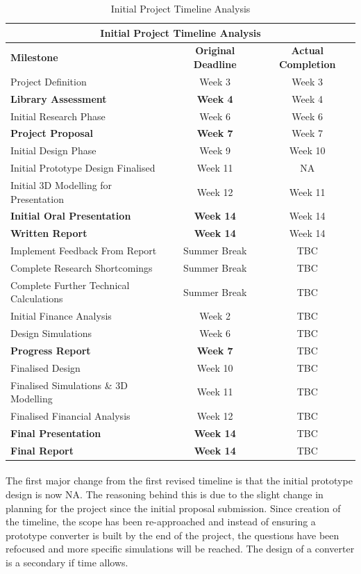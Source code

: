 \begin{table}[H]
\centering
\begin{tabular}{||p{5cm} c c||} 
 \hline
 \multicolumn{3}{|c|}{\textbf{Initial Project Timeline Analysis}} \\ \hline\hline
 \textbf{Milestone} & \textbf{Original Deadline} & \textbf{Actual Completion} \\ [0.5ex] 
 \hline\hline
 Project Definition & Week 3 & Week 3\\ 
 \textbf{Library Assessment} & \textbf{Week 4} & Week 4\\
 Initial Research Phase & Week 6 & Week 6\\
 \textbf{Project Proposal} & \textbf{Week 7} & Week 7\\
 Initial Design Phase & Week 9 & Week 10\\
 Initial Prototype Design Finalised & Week 11 & NA\\
 Initial 3D Modelling for Presentation & Week 12 & Week 11\\ 
 \textbf{Initial Oral Presentation} & \textbf{Week 14} & Week 14\\
 \textbf{Written Report} & \textbf{Week 14} & Week 14\\ 
 Implement Feedback From Report & Summer Break & TBC \\
 Complete Research Shortcomings & Summer Break & TBC \\
 Complete Further Technical Calculations & Summer Break & TBC \\
 Initial Finance Analysis & Week 2 & TBC \\
 Design Simulations & Week 6 & TBC \\ 
 \textbf{Progress Report} & \textbf{Week 7} & TBC \\
 Finalised Design & Week 10 & TBC \\
 Finalised Simulations \& 3D Modelling & Week 11 & TBC \\
 Finalised Financial Analysis & Week 12 & TBC \\ 
 \textbf{Final Presentation} & \textbf{Week 14} & TBC\\
 \textbf{Final Report} & \textbf{Week 14} & TBC\\ [1ex] 
 \hline
\end{tabular}
\caption{Initial Project Timeline Analysis}
\label{table:milestones_2}
\end{table}      

\paragraph{}
The first major change from the first revised timeline is that the initial prototype design is now NA. The reasoning behind this is due to the slight change in planning for the project since the initial proposal submission. Since creation of the timeline, the scope has been re-approached and instead of ensuring a prototype converter is built by the end of the project, the questions have been refocused and more specific simulations will be reached. The design of a converter is a secondary if time allows. 

